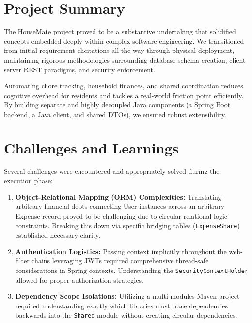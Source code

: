 \section{Project Summary}
The HouseMate project proved to be a substantive undertaking that solidified concepts embedded deeply within complex software engineering. We transitioned from initial requirement elicitations all the way through physical deployment, maintaining rigorous methodologies surrounding database schema creation, client-server REST paradigms, and security enforcement.

Automating chore tracking, household finances, and shared coordination reduces cognitive overhead for residents and tackles a real-world friction point efficiently. By building separate and highly decoupled Java components (a Spring Boot backend, a Java client, and shared DTOs), we ensured robust extensibility.

\section{Challenges and Learnings}
Several challenges were encountered and appropriately solved during the execution phase:
\begin{enumerate}
    \item \textbf{Object-Relational Mapping (ORM) Complexities:} Translating arbitrary financial debts connecting User instances across an arbitrary Expense record proved to be challenging due to circular relational logic constraints. Breaking this down via specific bridging tables (\texttt{ExpenseShare}) established necessary clarity.
    \item \textbf{Authentication Logistics:} Passing context implicitly throughout the web-filter chains leveraging JWTs required comprehensive thread-safe considerations in Spring contexts. Understanding the \texttt{SecurityContextHolder} allowed for proper authorization strategies.
    \item \textbf{Dependency Scope Isolations:} Utilizing a multi-modules Maven project required understanding exactly which libraries must trace dependencies backwards into the \texttt{Shared} module without creating circular dependencies.
\end{enumerate}

